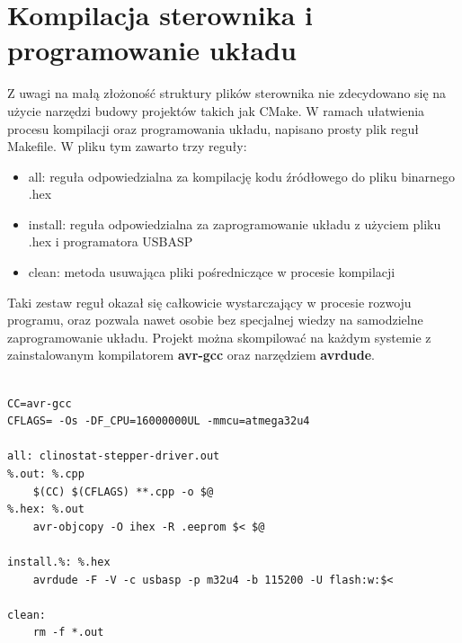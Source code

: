 \section{Kompilacja sterownika i programowanie układu}

Z uwagi na małą złożoność struktury plików sterownika nie zdecydowano się na użycie narzędzi budowy projektów takich jak CMake. W ramach ułatwienia procesu kompilacji oraz programowania układu, napisano prosty plik reguł Makefile. W pliku tym zawarto trzy reguły:
\begin{itemize}
	\item all: reguła odpowiedzialna za kompilację kodu źródłowego do pliku binarnego .hex
	\item install: reguła odpowiedzialna za zaprogramowanie układu z użyciem pliku .hex i programatora USBASP
	\item clean: metoda usuwająca pliki pośredniczące w procesie kompilacji
\end{itemize}
Taki zestaw reguł okazał się całkowicie wystarczający w procesie rozwoju programu, oraz pozwala nawet osobie bez specjalnej wiedzy na samodzielne zaprogramowanie układu. Projekt można skompilować na każdym systemie z zainstalowanym kompilatorem \textbf{avr-gcc} oraz narzędziem \textbf{avrdude}.

\begin{lstlisting}[caption=Makefile sterownika]

CC=avr-gcc
CFLAGS= -Os -DF_CPU=16000000UL -mmcu=atmega32u4

all: clinostat-stepper-driver.out
%.out: %.cpp
	$(CC) $(CFLAGS) **.cpp -o $@
%.hex: %.out
	avr-objcopy -O ihex -R .eeprom $< $@

install.%: %.hex
	avrdude -F -V -c usbasp -p m32u4 -b 115200 -U flash:w:$<

clean:
	rm -f *.out

\end{lstlisting}
